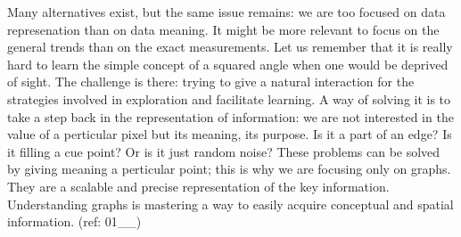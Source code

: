 Many alternatives exist, but the same issue remains: we are too focused
on data represenation than on data meaning. It might be more relevant to
focus on the general trends than on the exact measurements. Let us
remember that it is really hard to learn the simple concept of a squared
angle when one would be deprived of sight. The challenge is there:
trying to give a natural interaction for the strategies involved in
exploration and facilitate learning. A way of solving it is to take a
step back in the representation of information: we are not interested in
the value of a perticular pixel but its meaning, its purpose. Is it a
part of an edge? Is it filling a cue point? Or is it just random noise?
These problems can be solved by giving meaning a perticular point; this
is why we are focusing only on graphs. They are a scalable and precise
representation of the key information. Understanding graphs is mastering
a way to easily acquire conceptual and spatial information. (ref:
01\_\_)
